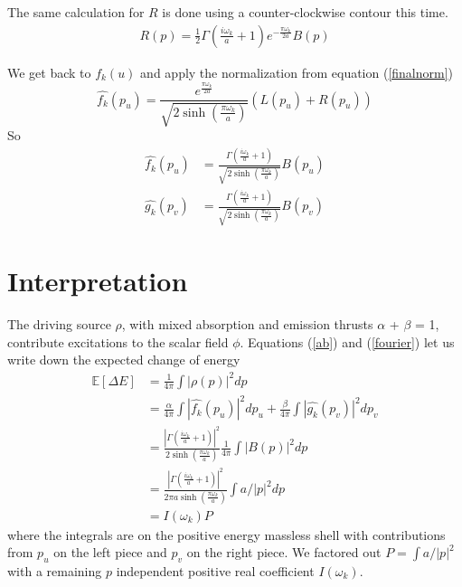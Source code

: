 \documentclass[12pt,a4paper]{article}
\begin{document}
The same calculation for $R$ is done using a counter-clockwise contour this time.
\begin{equation}
\begin{split}
  R(p) = \frac{1}{2}\Gamma\left(\frac{i\omega_k}{a} + 1\right) e^{-\frac{\pi \omega_k}{2a}} B(p)
\end{split}
\end{equation}

We get back to $f_k(u)$ and apply the normalization from equation (\ref{finalnorm})
\begin{equation}
\widehat{f_k}(p_u) = \frac{e^{\frac{\pi \omega_k}{2a}}}{\sqrt{2 \sinh \left({\frac{\pi\omega_k}{a}}\right)}}  ( L(p_u) + R(p_u) )
\end{equation}
So
\begin{equation}
\label{fourier}
\begin{split}
\widehat{f_k}(p_u) & = \frac{\Gamma\left(\frac{i\omega_k}{a} + 1\right)}{\sqrt{2 \sinh \left({\frac{\pi\omega_k}{a}}\right)}} B(p_u)\\
\widehat{g_k}(p_v) &= \frac{\Gamma\left(\frac{i\omega_k}{a} + 1\right)}{\sqrt{2 \sinh \left({\frac{\pi\omega_k}{a}}\right)}} B(p_v)
\end{split}
\end{equation}
\section{Interpretation}
The driving source $\rho$, with mixed absorption and emission thrusts $\alpha$ + $\beta$ = 1, contribute excitations to the scalar field $\phi$. Equations (\ref{ab}) and (\ref{fourier}) let us write down the expected change of energy
\begin{equation}  
  \label{number}
  \begin{split}
    \mathbb{E}[\Delta E] &= \frac{1}{4\pi} \int{|\rho(p)|^2 dp} \\
    &= \frac{\alpha}{4\pi} \int{\left|\widehat{f_k}(p_u)\right|^2 dp_u} + \frac{\beta}{4\pi}\int{\left|\widehat{g_k}(p_v)\right|^2dp_v} \\
    &= \frac{\left|\Gamma\left(\frac{i\omega_k}{a} + 1\right)\right|^2}{2 \sinh \left({\frac{\pi\omega_k}{a}}\right)} \frac{1}{4\pi} \int{{\left|B(p)\right|^2} dp} \\
    &=  \frac{\left|\Gamma\left(\frac{i\omega_k}{a} + 1\right)\right|^2}{2 \pi a \sinh \left({\frac{\pi\omega_k}{a}}\right)} \int{a/|p|^2 dp}\\  
&=I(\omega_k) P
  \end{split}
\end{equation}
where the integrals are on the positive energy massless shell with contributions from $p_u$ on the left piece and $p_v$ on the right piece.  We factored out $P = \int{a/|p|^2}$ with a remaining $p$ independent positive real coefficient $I(\omega_k)$.
\end{document}
